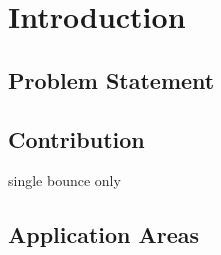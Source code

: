 
\chapter{Introduction}
\label{chap:introduction}


\section{Problem Statement}



\section{Contribution}

single bounce only



\section{Application Areas}


\cleardoublepage
